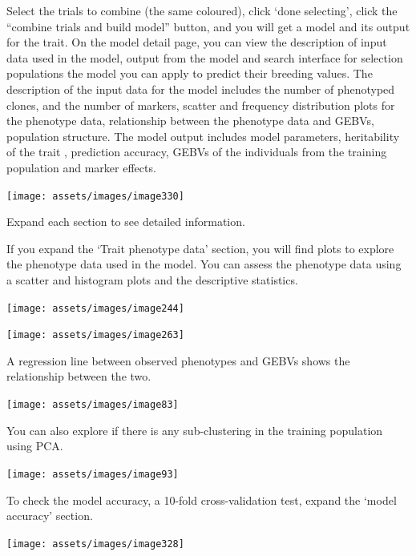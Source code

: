 \documentclass[
  12pt,
]{book}
\begin{document}
Select the trials to combine (the same coloured), click `done selecting', click the ``combine trials and build model'' button, and you will get a model and its output for the trait. On the model detail page, you can view the description of input data used in the model, output from the model and search interface for selection populations the model you can apply to predict their breeding values. The description of the input data for the model includes the number of phenotyped clones, and the number of markers, scatter and frequency distribution plots for the phenotype data, relationship between the phenotype data and GEBVs, population structure. The model output includes model parameters, heritability of the trait , prediction accuracy, GEBVs of the individuals from the training population and marker effects.

\begin{center}\texttt{[image: assets/images/image330]} \end{center}

Expand each section to see detailed information.

If you expand the `Trait phenotype data' section, you will find plots to explore the phenotype data used in the model. You can assess the phenotype data using a scatter and histogram plots and the descriptive statistics.

\begin{center}\texttt{[image: assets/images/image244]} \end{center}

\begin{center}\texttt{[image: assets/images/image263]} \end{center}

A regression line between observed phenotypes and GEBVs shows the relationship between the two.

\begin{center}\texttt{[image: assets/images/image83]} \end{center}

You can also explore if there is any sub-clustering in the training population using PCA.

\begin{center}\texttt{[image: assets/images/image93]} \end{center}

To check the model accuracy, a 10-fold cross-validation test, expand the `model accuracy' section.

\begin{center}\texttt{[image: assets/images/image328]} \end{center}
\end{document}
